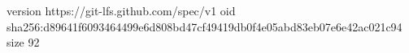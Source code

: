 version https://git-lfs.github.com/spec/v1
oid sha256:d89641f6093464499e6d808bd47cf49419db0f4e05abd83eb07e6e42ac021c94
size 92
